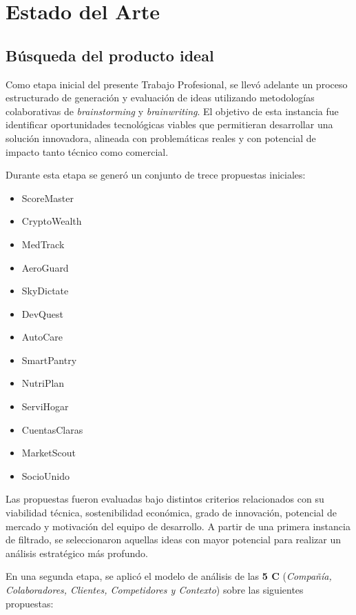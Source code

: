 \section{Estado del Arte}

\subsection{Búsqueda del producto ideal}

Como etapa inicial del presente Trabajo Profesional, se llevó adelante un proceso estructurado de generación y evaluación de ideas utilizando metodologías colaborativas de \textit{brainstorming} y \textit{brainwriting}. El objetivo de esta instancia fue identificar oportunidades tecnológicas viables que permitieran desarrollar una solución innovadora, alineada con problemáticas reales y con potencial de impacto tanto técnico como comercial.

Durante esta etapa se generó un conjunto de trece propuestas iniciales:

\begin{itemize}
    \item ScoreMaster
    \item CryptoWealth
    \item MedTrack
    \item AeroGuard
    \item SkyDictate
    \item DevQuest
    \item AutoCare
    \item SmartPantry
    \item NutriPlan
    \item ServiHogar
    \item CuentasClaras
    \item MarketScout
    \item SocioUnido
\end{itemize}

Las propuestas fueron evaluadas bajo distintos criterios relacionados con su viabilidad técnica, sostenibilidad económica, grado de innovación, potencial de mercado y motivación del equipo de desarrollo. A partir de una primera instancia de filtrado, se seleccionaron aquellas ideas con mayor potencial para realizar un análisis estratégico más profundo.

En una segunda etapa, se aplicó el modelo de análisis de las \textbf{5 C} (\textit{Compañía, Colaboradores, Clientes, Competidores y Contexto}) sobre las siguientes propuestas:

